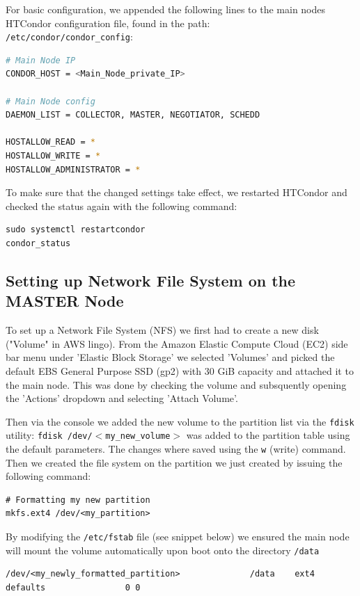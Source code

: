 \documentclass{article}
\begin{document}
For basic configuration, we appended the following lines to the main nodes HTCondor configuration file, found in the path:\\
\texttt{/etc/condor/condor\_config}:

\begin{lstlisting}[language=bash]
# Main Node IP
CONDOR_HOST = <Main_Node_private_IP>

# Main Node config 
DAEMON_LIST = COLLECTOR, MASTER, NEGOTIATOR, SCHEDD

HOSTALLOW_READ = *
HOSTALLOW_WRITE = *
HOSTALLOW_ADMINISTRATOR = *
\end{lstlisting}

To make sure that the changed settings take effect, we restarted HTCondor and checked the status again with the following command:
\begin{lstlisting}
sudo systemctl restartcondor
condor_status
\end{lstlisting}

\subsection{Setting up Network File System on the MASTER Node}

To set up a Network File System (NFS) we first had to create a new disk ("Volume" in AWS lingo).
From the Amazon Elastic Compute Cloud (EC2) side bar menu under 'Elastic Block Storage' we selected 'Volumes' and picked the default EBS General Purpose SSD (gp2) with 30 GiB capacity and attached it to the main node. 
This was done by checking the volume and subsquently opening the 'Actions' dropdown and selecting 'Attach Volume'.

Then via the console we added the new volume to the partition list via the \texttt{fdisk} utility: \newline
\texttt{fdisk /dev/$<$my\_new\_volume$>$} was added to the partition table using the default parameters. The changes where saved using the \texttt{w} (write) command. Then we created the file system on the partition we just created by issuing the following command: 

\begin{lstlisting}
# Formatting my new partition
mkfs.ext4 /dev/<my_partition>
\end{lstlisting}

By modifying the \texttt{/etc/fstab} file (see snippet below) we ensured the main node will mount the volume automatically upon boot onto the directory \texttt{/data}
\begin{lstlisting}
/dev/<my_newly_formatted_partition>              /data    ext4   defaults                0 0
\end{lstlisting}
\end{document}
